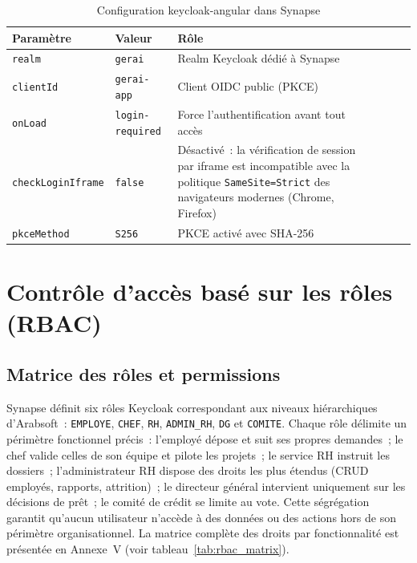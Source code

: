 \begin{table}[H]
\centering
\caption{Configuration keycloak-angular dans Synapse}
\label{tab:kc_angular_config}
\begin{tabularx}{\textwidth}{VlVlVLV}
\hline
\textbf{Paramètre} & \textbf{Valeur} & \textbf{Rôle} \\
\hline
\texttt{realm} & \texttt{gerai} & Realm Keycloak dédié à Synapse \\
\hline
\texttt{clientId} & \texttt{gerai-app} & Client OIDC public (PKCE) \\
\hline
\texttt{onLoad} & \texttt{login-required} & Force l’authentification avant tout accès \\
\hline
\texttt{checkLoginIframe} & \texttt{false} & Désactivé~: la vérification de session par iframe est incompatible avec la politique \texttt{SameSite=Strict} des navigateurs modernes (Chrome, Firefox) \\
\hline
\texttt{pkceMethod} & \texttt{S256} & PKCE activé avec SHA-256 \\
\hline
\end{tabularx}
\end{table}

\section{Contrôle d’accès basé sur les rôles (RBAC)}

\subsection{Matrice des rôles et permissions}

Synapse définit six rôles Keycloak correspondant aux niveaux hiérarchiques d’Arabsoft~:
\texttt{EMPLOYE}, \texttt{CHEF}, \texttt{RH}, \texttt{ADMIN\_RH}, \texttt{DG} et
\texttt{COMITE}. Chaque rôle délimite un périmètre fonctionnel précis~: l’employé
dépose et suit ses propres demandes~; le chef valide celles de son équipe et pilote
les projets~; le service RH instruit les dossiers~; l’administrateur RH dispose des
droits les plus étendus (CRUD employés, rapports, attrition)~; le directeur général
intervient uniquement sur les décisions de prêt~; le comité de crédit se limite au
vote. Cette ségrégation garantit qu’aucun utilisateur n’accède à des données ou
des actions hors de son périmètre organisationnel. La matrice complète des droits
par fonctionnalité est présentée en Annexe~V (voir tableau~\ref{tab:rbac_matrix}).


